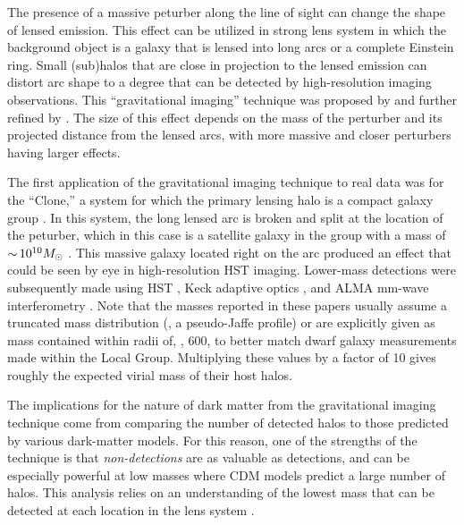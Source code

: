 \vspace{1em} 

The presence of a massive peturber along the line of sight can change the shape of lensed emission. 
This effect can be utilized in strong lens system in which the background object is a galaxy that is lensed into long arcs or a complete Einstein ring.
Small (sub)halos that are close in projection to the lensed emission can distort arc shape to a degree that can be detected by high-resolution imaging observations.
This ``gravitational imaging'' technique was proposed by \cite{Koopmans:aa} and further refined by \citet{Vegetti:2008aa,Vegetti:2009aa}.  The size of this effect depends on the mass of the perturber and its projected distance from the lensed arcs, with more massive and closer perturbers having larger effects.
 
The first application of the gravitational imaging technique to real data was for the ``Clone,'' a system for which the primary lensing halo is a compact galaxy group \citep[,][]{2009ApJ...699.1242L, Vegetti_2010_1}. In this system, the long lensed arc is broken and split at the location of the peturber, which in this case is a satellite galaxy in the group with a mass of $ {\sim}\, 10^{10} M_\odot$ \citep[][]{Vegetti_2010_1}.  This massive galaxy located right on the arc produced an effect that could be seen by eye in high-resolution HST imaging.  Lower-mass detections were subsequently made using HST \citep[$\roughly 10^9 \Msun$;][]{Vegetti_2010_2}, Keck adaptive optics \citep[$\roughly 10^8 \Msun$;][]{Vegetti_2012}, and ALMA mm-wave interferometry \citep[$\roughly 10^8 \Msun$;][]{Hezaveh_2016ltk}.  
Note that the masses reported in these papers usually assume a truncated mass distribution (\eg, a pseudo-Jaffe profile) or are explicitly given as mass contained within radii of, \eg, 600\pc, to better match dwarf galaxy measurements made within the Local Group.  Multiplying these values by a factor of 10 gives roughly the expected virial mass of their host halos.
 
The implications for the nature of dark matter from the gravitational imaging technique come from comparing the number of detected halos to those predicted by various dark-matter models.  
For this reason, one of the strengths of the technique is that {\em non-detections} are as valuable as detections, and can be especially powerful at low masses where CDM models predict a large number of halos.
This analysis relies on an understanding of the lowest mass that can be detected at each location in the lens system \citep[\eg,][]{Vegetti2014, Hezaveh_2016ltk, Ritondale++18}.
 
